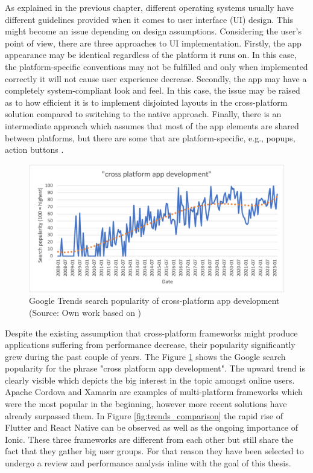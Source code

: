 As explained in the previous chapter, different operating systems usually have different guidelines provided when it comes to user interface (UI) design. This might become an issue depending on design assumptions. Considering the user's point of view, there are three approaches to UI implementation. Firstly, the app appearance may be identical regardless of the platform it runs on. In this case, the platform-specific conventions may not be fulfilled and only when implemented correctly it will not cause user experience decrease. Secondly, the app may have a completely system-compliant look and feel. In this case, the issue may be raised as to how efficient it is to implement disjointed layouts in the cross-platform solution compared to switching to the native approach. Finally, there is an intermediate approach which assumes that most of the app elements are shared between platforms, but there are some that are platform-specific, e.g., popups, action buttons \cite{cross_platform_ux,baseline_cross_platform}.

\begin{figure}[h]
	\centering
	\includegraphics[width=\textwidth]{img/google_trends_cross_platform}
	\caption{Google Trends search popularity of cross-platform app development (Source: Own work based on \cite{trends_cross_platform})}
	\label{fig:trends_cross_platform}
\end{figure}

Despite the existing assumption that cross-platform frameworks might produce applications suffering from performance decrease, their popularity significantly grew during the past couple of years. The Figure \ref{fig:trends_cross_platform} shows the Google search popularity for the phrase "cross platform app development". The upward trend is clearly visible which depicts the big interest in the topic amongst online users. Apache Cordova and Xamarin are examples of multi-platform frameworks which were the most popular in the beginning, however more recent solutions have already surpassed them. In Figure \ref{fig:trends_comparison} the rapid rise of Flutter and React Native can be observed as well as the ongoing importance of Ionic. These three frameworks are different from each other but still share the fact that they gather big user groups. For that reason they have been selected to undergo a review and performance analysis inline with the goal of this thesis.

